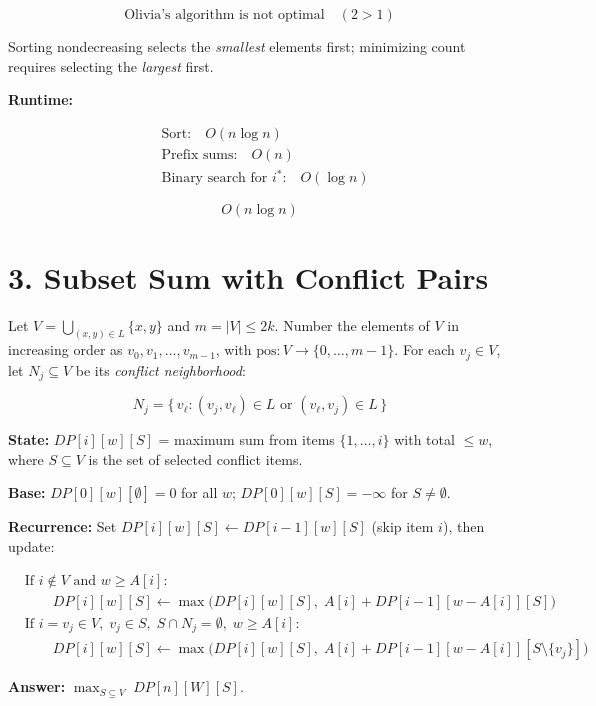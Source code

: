 \documentclass[11pt]{article}
\begin{document}
\[
\boxed{\text{Olivia's algorithm is not optimal} \quad (2 > 1)}
\]

Sorting nondecreasing selects the \emph{smallest} elements first; minimizing count requires selecting the \emph{largest} first.

\textbf{Runtime:}

\begin{align*}
&\text{Sort:} \quad O(n \log n) \\
&\text{Prefix sums:} \quad O(n) \\
&\text{Binary search for } i^*\text{:} \quad O(\log n)
\end{align*}

\[
\boxed{O(n \log n)}
\]


\section*{3. Subset Sum with Conflict Pairs}

Let $V = \bigcup_{(x,y) \in L} \{x, y\}$ and $m = |V| \le 2k$.
Number the elements of $V$ in increasing order as $v_0, v_1, \ldots, v_{m-1}$,
with $\mathrm{pos}\colon V \to \{0, \ldots, m{-}1\}$.
For each $v_j \in V$, let $N_j \subseteq V$ be its \emph{conflict neighborhood}:

\[
N_j = \{\, v_\ell : (v_j, v_\ell) \in L \text{ or } (v_\ell, v_j) \in L \,\}
\]

\textbf{State:}
$DP[i][w][S]$ = maximum sum from items $\{1, \ldots, i\}$
with total $\le w$, where $S \subseteq V$ is the set of selected conflict items.

\textbf{Base:}
$DP[0][w][\emptyset] = 0$ for all $w$; \quad $DP[0][w][S] = -\infty$ for $S \ne \emptyset$.

\textbf{Recurrence:}
Set $DP[i][w][S] \longleftarrow DP[i{-}1][w][S]$ (skip item $i$), then update:

\begin{align*}
&\text{If } i \notin V \text{ and } w \ge A[i]\text{:} \\
&\qquad DP[i][w][S] \longleftarrow
  \max\!\big(DP[i][w][S],\; A[i] + DP[i{-}1][w{-}A[i]][S]\big) \\[6pt]
&\text{If } i = v_j \in V,\; v_j \in S,\;
  S \cap N_j = \emptyset,\; w \ge A[i]\text{:} \\
&\qquad DP[i][w][S] \longleftarrow
  \max\!\big(DP[i][w][S],\; A[i] + DP[i{-}1][w{-}A[i]][S \setminus \{v_j\}]\big)
\end{align*}

\textbf{Answer:} $\displaystyle\max_{S \subseteq V}\; DP[n][W][S]$.
\end{document}
